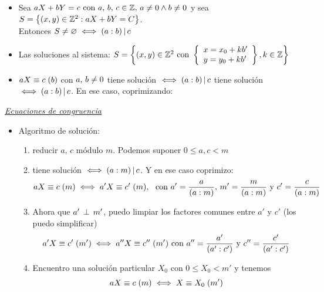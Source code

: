 \def\MCD{(a:b)}

\begin{itemize}
	\item Sea $aX + bY = c \text{ con } a,\, b,\, c \en \enteros,\, a \distinto 0 \y b \distinto 0$ y sea
	      $S = \set{ (x,y) \en \enteros^2 : aX + bY = C }$.\\
	      Entonces $S \distinto \vacio \sisolosi (a:b) \divideA c$

	\item Las soluciones al sistema: $S = \set{(x,y) \en \enteros^2 \text{ con }
			      \llaves{l}{
				      x = x_0 + kb'\\
				      y = y_0 + kb'
			      }
			      , k \en \enteros}
	      $

	\item $\congruencia{aX}{c}{b}$  con  $ a,\, b \distinto 0$ tiene solución $\sisolosi \MCD \divideA c$ tiene solución $\sisolosi \MCD \divideA c$. En ese caso, coprimizando:
\end{itemize}

\textit\underline{Ecuaciones de congruencia}

\begin{itemize}
	\item Algoritmo de solución:
	      \begin{enumerate}[label=\arabic*)]
		      \item reducir $a,\, c$ módulo $m$. Podemos suponer $0 \leq a, c < m$
		      \item tiene solución $\sisolosi (a:m) \divideA c$. Y en ese caso coprimizo:
		            \[
			            \congruencia{aX}{c}{m} \sisolosi \congruencia{a'X}{c'}{m},\ \text{ con } a' = \frac{a}{(a:m)},\, m' = \frac{m}{(a:m)} \text{ y } c' = \frac{c}{(a:m)}
		            \]
		      \item   Ahora que $a' \cop m'$, puedo limpiar los factores comunes entre
                $a'$ y $c'$ (los puedo simplificar)
		            \[
                      \congruencia{a'X}{c'}{m'}
                      \sisolosi
                      \congruencia{a''X}{c''}{m'}
                      \text{ con }
                      a'' = \frac{a'}{(a':c')} \text{ y } c'' = \frac{c'}{(a':c')}
		            \]
		      \item Encuentro una solución particular $X_0$ con $ 0\leq X_0 < m'$ y tenemos
		            \[
			            \congruencia{aX}{c}{m} \sisolosi \congruencia{X}{X_0}{m'}
		            \]
	      \end{enumerate}

\end{itemize}

